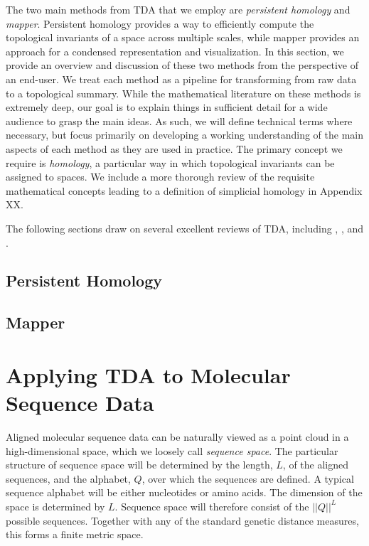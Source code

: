 The two main methods from TDA that we employ are \emph{persistent homology} and \emph{mapper}.
Persistent homology provides a way to efficiently compute the topological invariants of a space across multiple scales, while mapper provides an approach for a condensed representation and visualization.
In this section, we provide an overview and discussion of these two methods from the perspective of an end-user.
We treat each method as a pipeline for transforming from raw data to a topological summary.
While the mathematical literature on these methods is extremely deep, our goal is to explain things in sufficient detail for a wide audience to grasp the main ideas.
As such, we will define technical terms where necessary, but focus primarily on developing a working understanding of the main aspects of each method as they are used in practice.
The primary concept we require is \emph{homology}, a particular way in which topological invariants can be assigned to spaces.
We include a more thorough review of the requisite mathematical concepts leading to a definition of simplicial homology in Appendix XX.

The following sections draw on several excellent reviews of TDA, including \cite{Carlsson:2009a}, \cite{Edelsbrunner:2010}, and \cite{Ghrist:2008}.

\subsection{Persistent Homology}


\subsection{Mapper}


\section{Applying TDA to Molecular Sequence Data}

Aligned molecular sequence data can be naturally viewed as a point cloud in a high-dimensional space, which we loosely call \emph{sequence space}.
The particular structure of sequence space will be determined by the length, $L$, of the aligned sequences, and the alphabet, $Q$, over which the sequences are defined.
A typical sequence alphabet will be either nucleotides or amino acids.
The dimension of the space is determined by $L$.
Sequence space will therefore consist of the $||Q||^L$ possible sequences.
Together with any of the standard genetic distance measures, this forms a finite metric space.

